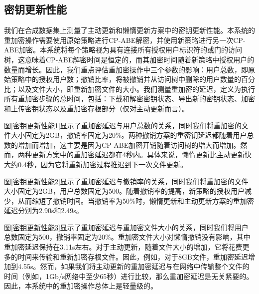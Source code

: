 \documentclass[promaster]{thesis-uestc}
\begin{document}
\subsection{密钥更新性能}

我们在合成数据集上测量了主动更新和懒惰更新方案中的密钥更新性能。本系统的重加密操作需要使用原始策略进行CP-ABE解密，并使用新策略进行另一次CP-ABE加密。本系统将每个策略视为具有连接所有授权用户标识符的或门的访问树，这意味着CP-ABE解密时间是恒定的，而其加密时间随着新策略中授权用户的数量而增长。因此，我们重点评估重加密操作中三个参数的影响：用户总数，即原始策略中的授权用户数；撤销比率，将被撤销并从访问树中删除的用户数量的百分比；以及文件大小，即重新加密文件的大小。我们测量重加密的延迟，定义为执行所有重加密步骤的总时间，包括：下载和解密密钥状态、导出新的密钥状态、加密和上传密钥状态以及重加密存根部分（仅对主动更新而言）。

图\ref{密钥更新性能1}显示了重加密延迟与用户总数的关系，同时我们将重加密的文件大小固定为2GB，撤销率固定为20\%。两种撤销方案的重密钥延迟都随着用户总数的增加而增加，这主要是因为CP-ABE加密开销随着访问树的增大而增加。然而，两种更新方案中的重加密延迟都在4秒内。具体来说，懒惰更新比主动更新快大约0.4秒，因为它将重新加密过程推迟到下一次文件更新。

图\ref{密钥更新性能2}显示了重加密延迟与撤销率的关系，同时我们将重加密的文件大小固定为2GB，用户总数固定为500。随着撤销率的提高，新策略的授权用户减少，从而缩短了撤销时间。当撤销率为50\%时，懒惰更新和主动更新方案的重加密延迟分别为2.90s和2.49s。

图\ref{密钥更新性能3}显示了重加密延迟与重加密文件大小的关系，同时我们将用户总数固定为500，撤销率固定为20\%。重加密文件大小对懒惰撤销没有影响，其中重加密延迟保持在3.11s左右。对于主动更新，随着文件大小的增加，它将花费更多的时间来传输和重新加密存根文件。因此，例如，对于8GB文件，重加密延迟增加到4.55s。然而，如果我们将主动更新的重加密延迟与在网络中传输整个文件的时间（例如，1Gb/s网络中至少65秒）进行比较，那么重加密延迟是无关紧要的。因此，本系统中的重加密操作总体上是轻量级的。
\end{document}
